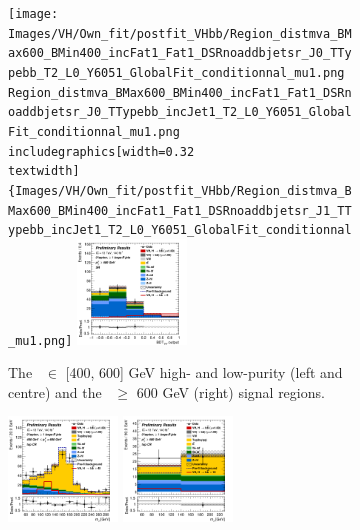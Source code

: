 \begin{figure}[h!]
    \centering
    \begin{subfigure}[b]{\textwidth}
        \centering
        \texttt{[image: Images/VH/Own\_fit/postfit\_VHbb/Region\_distmva\_BMax600\_BMin400\_incFat1\_Fat1\_DSRnoaddbjetsr\_J0\_TTypebb\_T2\_L0\_Y6051\_GlobalFit\_conditionnal\_mu1.png
                                                                              Region\_distmva\_BMax600\_BMin400\_incFat1\_Fat1\_DSRnoaddbjetsr\_J0\_TTypebb\_incJet1\_T2\_L0\_Y6051\_GlobalFit\_conditionnal\_mu1.png
        \\includegraphics[width=0.32\\textwidth]\{Images/VH/Own\_fit/postfit\_VHbb/Region\_distmva\_BMax600\_BMin400\_incFat1\_Fat1\_DSRnoaddbjetsr\_J1\_TTypebb\_incJet1\_T2\_L0\_Y6051\_GlobalFit\_conditionnal\_mu1.png]}
        \includegraphics[width=0.32\textwidth]{Images/VH/Own_fit/postfit_VHbb/Region_distmva_BMin600_incFat1_Fat1_DSRnoaddbjetsr_J0_TTypebb_incJet1_T2_L0_Y6051_GlobalFit_conditionnal_mu1.png}
        \caption{The \ptv\ $\in$ [400, 600] GeV high- and low-purity (left and centre) and the \ptv\ $\geq$ 600 GeV (right) signal regions.}
        \label{fig:plots_VHbbBoost_OL_SR}
    \end{subfigure}
    \begin{subfigure}[b]{\textwidth}
        \centering
        \includegraphics[width=0.32\textwidth]{Images/VH/Own_fit/postfit_VHbb/Region_distmBB_BMax600_BMin400_incFat1_Fat1_DSRtopaddbjetcr_J0_TTypebb_incJet1_T2_L0_Y6051_GlobalFit_conditionnal_mu1.png}
        \includegraphics[width=0.32\textwidth]{Images/VH/Own_fit/postfit_VHbb/Region_distmBB_BMin600_incFat1_Fat1_DSRtopaddbjetcr_J0_TTypebb_incJet1_T2_L0_Y6051_GlobalFit_conditionnal_mu1.png}

\end{subfigure}
\end{figure}
